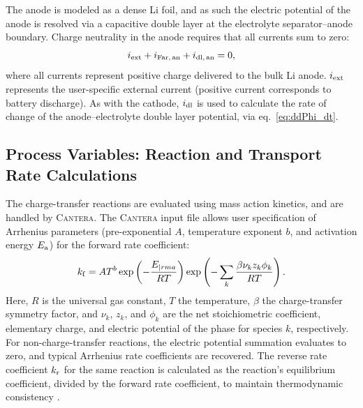 \documentclass{elsarticle}
\begin{document}
The anode is modeled as a dense Li foil, and as such the electric potential of the anode is resolved via a capacitive double layer at the electrolyte separator--anode boundary.  Charge neutrality in the anode requires that all currents sum to zero:
\begin{equation}\label{eq:ChargeConsAnode}
    i_{\rm ext} + i_{\rm Far,\,an} + i_{\rm dl,\,an} = 0,
\end{equation}
where all currents represent positive charge delivered to the bulk Li anode.  $i_{\rm ext}$ represents the user-specific external current (positive current corresponds to battery discharge).  As with the cathode, $i_{\rm dl}$ is used to calculate the rate of change of the anode--electrolyte double layer potential, via eq.~\ref{eq:ddPhi_dt}.


\subsection{Process Variables: Reaction and Transport Rate Calculations}

The charge-transfer reactions are evaluated using mass action kinetics, and are handled by \textsc{Cantera}. The \textsc{Cantera} input file allows user specification of Arrhenius parameters (pre-exponential $A$, temperature exponent $b$, and activation energy $E_{\rm a}$) for the forward rate coefficient:
\begin{equation}\label{eq:k_fwd_echem}
    k_{\rm f} = AT^b\exp\left(-\frac{E_{|rm a}}{RT}\right)\exp\left(-\sum_k\frac{\beta\nu_kz_k\phi_k}{RT}\right).
\end{equation}
Here, $R$ is the universal gas constant, $T$ the temperature, $\beta$ the charge-transfer symmetry factor, and $\nu_k$, $z_k$, and $\phi_k$ are the net stoichiometric coefficient, elementary charge, and electric potential of the phase for species $k$, respectively.  For non-charge-transfer reactions, the electric potential summation evaluates to zero, and typical Arrhenius rate coefficients are recovered.  The reverse rate coefficient $k_{\rm r}$ for the same reaction is calculated as the reaction's equilibrium coefficient, divided by the forward rate coefficient, to maintain thermodynamic consistency \cite{DeCaluwe_2018}.
\end{document}
